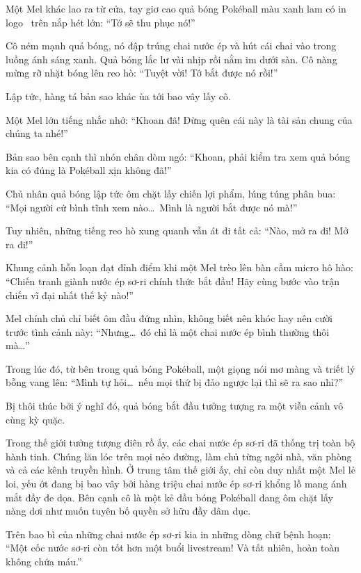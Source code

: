 \documentclass[../main.tex]{subfiles}
\begin{document}

Một Mel khác lao ra từ cửa, tay giơ cao quả bóng Pokéball màu xanh lam có in logo \hll\ trên nắp hét lớn: ``Tớ sẽ thu phục nó!''

Cô ném mạnh quả bóng, nó đập trúng chai nước ép và hút cái chai vào trong luồng ánh sáng xanh. Quả bóng lắc lư vài nhịp rồi nằm im dưới sàn. Cô nàng mừng rỡ nhặt bóng lên reo hò: ``Tuyệt vời! Tớ bắt được nó rồi!''

Lập tức, hàng tá bản sao khác ùa tới bao vây lấy cô.

Một Mel lớn tiếng nhắc nhở: ``Khoan đã! Đừng quên cái này là tài sản chung của chúng ta nhé!''

Bản sao bên cạnh thì nhón chân dòm ngó: ``Khoan, phải kiểm tra xem quả bóng kia có đúng là Pokéball xịn không đã!''

Chủ nhân quả bóng lập tức ôm chặt lấy chiến lợi phẩm, lúng túng phân bua: ``Mọi người cứ bình tĩnh xem nào\dots\ Mình là người bắt được nó mà!''

Tuy nhiên, những tiếng reo hò xung quanh vẫn át đi tất cả: ``Nào, mở ra đi! Mở ra đi!''

Khung cảnh hỗn loạn đạt đỉnh điểm khi một Mel trèo lên bàn cầm micro hô hào: ``Chiến tranh giành nước ép sơ-ri chính thức bắt đầu! Hãy cùng bước vào trận chiến vĩ đại nhất thế kỷ nào!''

Mel chính chủ chỉ biết ôm đầu đứng nhìn, không biết nên khóc hay nên cười trước tình cảnh này: ``Nhưng\dots\ đó chỉ là một chai nước ép bình thường thôi mà\dots''

Trong lúc đó, từ bên trong quả bóng Pokéball, một giọng nói mơ màng và triết lý bỗng vang lên: ``Mình tự hỏi\dots\ nếu mọi thứ bị đảo ngược lại thì sẽ ra sao nhỉ?''

Bị thôi thúc bởi ý nghĩ đó, quả bóng bắt đầu tưởng tượng ra một viễn cảnh vô cùng kỳ quặc.


Trong thế giới tưởng tượng điên rồ ấy, các chai nước ép sơ-ri đã thống trị toàn bộ hành tinh. Chúng lăn lóc trên mọi nẻo đường, làm chủ từng ngôi nhà, văn phòng và cả các kênh truyền hình. Ở trung tâm thế giới ấy, chỉ còn duy nhất một Mel lẻ loi, yếu ớt đang bị bao vây bởi hàng triệu chai nước ép sơ-ri khổng lồ mang ánh mắt đầy đe dọa. Bên cạnh cô là một kẻ đầu bóng Pokéball đang ôm chặt lấy nàng dơi như muốn tuyên bố quyền sở hữu đầy dâm dục.

Trên bao bì của những chai nước ép sơ-ri kia in những dòng chữ bệnh hoạn: ``Một cốc nước sơ-ri còn tốt hơn một buổi livestream! Và tất nhiên, hoàn toàn không chứa máu.''
\end{document}
